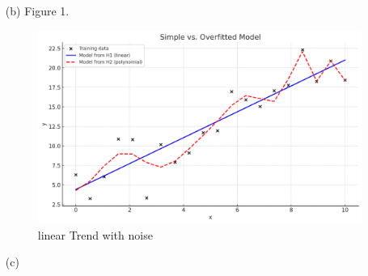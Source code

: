 \documentclass[12pt]{article}
\begin{document}
\begin{itemize}
\begin{itemize}
\item[(b)]
Figure 1.
\begin{figure}
    \centering
    \includegraphics[width=1\linewidth]{image.png}
    \caption{linear Trend with noise}
\end{figure}

\item[(c)] 


\end{itemize}
\end{itemize}
\end{document}
